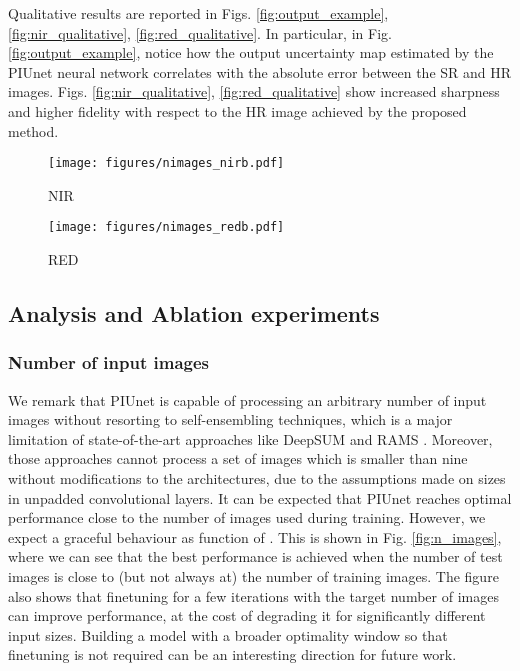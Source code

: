 \documentclass[journal]{IEEEtran}
\begin{document}
Qualitative results are reported in Figs. \ref{fig:output_example}, \ref{fig:nir_qualitative}, \ref{fig:red_qualitative}. In particular, in Fig.\ref{fig:output_example}, notice how the output uncertainty map estimated by the PIUnet neural network correlates with the absolute error between the SR and HR images. Figs. \ref{fig:nir_qualitative}, \ref{fig:red_qualitative} show increased sharpness and higher fidelity with respect to the HR image achieved by the proposed method.



\begin{figure*}[ht]
    \centering
    \begin{subfigure}[b]{0.45\textwidth}
    \centering
    \texttt{[image: figures/nimages\_nirb.pdf]}
    \caption{NIR}
    \end{subfigure}
    \begin{subfigure}[b]{0.45\textwidth}
    \centering
    \texttt{[image: figures/nimages\_redb.pdf]}
    \caption{RED}
    \end{subfigure}
    \caption{Performance on the validation set as function of number of input LR images. Notice how the trained model gracefully handles any input size, but optimal performance may require finetuning.}
    \label{fig:n_images}
\end{figure*}


\subsection{Analysis and Ablation experiments}

\subsubsection{Number of input images}
We remark that PIUnet is capable of processing an arbitrary number of input images without resorting to self-ensembling techniques, which is a major limitation of state-of-the-art approaches like DeepSUM \cite{molini2019deepsum} and RAMS \cite{salvetti2020multi}. Moreover, those approaches cannot process a set of images which is smaller than nine without modifications to the architectures, due to the assumptions made on sizes in unpadded convolutional layers. It can be expected that PIUnet reaches optimal performance close to the number of images used during training. However, we expect a graceful behaviour as function of . This is shown in Fig. \ref{fig:n_images}, where we can see that the best performance is achieved when the number of test images is close to (but not always at) the number of training images. The figure also shows that finetuning for a few iterations with the target number of images can improve performance, at the cost of degrading it for significantly different input sizes. Building a model with a broader optimality window so that finetuning is not required can be an interesting direction for future work. 
\end{document}
